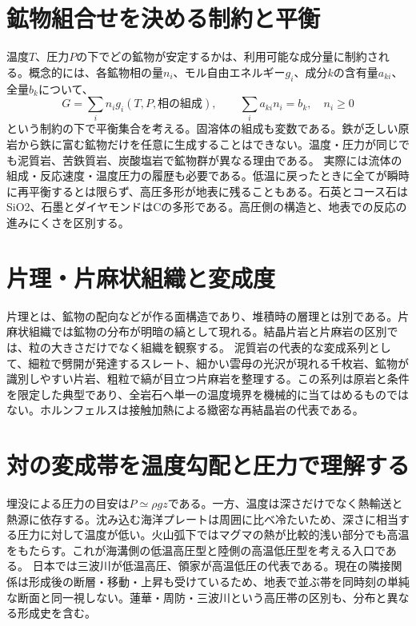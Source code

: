 \section{鉱物組合せを決める制約と平衡}
\label{theory:petrology:equilibrium}
温度\(T\)、圧力\(P\)の下でどの鉱物が安定するかは、利用可能な成分量に制約される。概念的には、各鉱物相の量\(n_i\)、モル自由エネルギー\(g_i\)、成分\(k\)の含有量\(a_{ki}\)、全量\(b_k\)について、
\[
G=\sum_i n_i g_i(T,P,\text{相の組成}),\qquad
\sum_i a_{ki}n_i=b_k,\quad n_i\geq0
\]
という制約の下で平衡集合を考える。固溶体の組成も変数である。鉄が乏しい原岩から鉄に富む鉱物だけを任意に生成することはできない。温度・圧力が同じでも泥質岩、苦鉄質岩、炭酸塩岩で鉱物群が異なる理由である\cite{nelson_assemblages2011}。
実際には流体の組成・反応速度・温度圧力の履歴も必要である。低温に戻ったときに全てが瞬時に再平衡するとは限らず、高圧多形が地表に残ることもある。石英とコース石はSiO2、石墨とダイヤモンドはCの多形である\cite{hokkaido_polymorph2012}。高圧側の構造と、地表での反応の進みにくさを区別する。

\section{片理・片麻状組織と変成度}
\label{theory:petrology:textures}
片理とは、鉱物の配向などが作る面構造であり、堆積時の層理とは別である。片麻状組織では鉱物の分布が明暗の縞として現れる。結晶片岩と片麻岩の区別では、粒の大きさだけでなく組織を観察する\cite{gsj_metamorphic_words}。
泥質岩の代表的な変成系列として、細粒で劈開が発達するスレート、細かい雲母の光沢が現れる千枚岩、鉱物が識別しやすい片岩、粗粒で縞が目立つ片麻岩を整理する\cite{nelson_regional2011}。この系列は原岩と条件を限定した典型であり、全岩石へ単一の温度境界を機械的に当てはめるものではない。ホルンフェルスは接触加熱による緻密な再結晶岩の代表である。

\section{対の変成帯を温度勾配と圧力で理解する}
\label{theory:petrology:paired}
埋没による圧力の目安は\(P\simeq\rho g z\)である。一方、温度は深さだけでなく熱輸送と熱源に依存する。沈み込む海洋プレートは周囲に比べ冷たいため、深さに相当する圧力に対して温度が低い。火山弧下ではマグマの熱が比較的浅い部分でも高温をもたらす。これが海溝側の低温高圧型と陸側の高温低圧型を考える入口である。
日本では三波川が低温高圧、領家が高温低圧の代表である\cite{aist_awa2021}。現在の隣接関係は形成後の断層・移動・上昇も受けているため、地表で並ぶ帯を同時刻の単純な断面と同一視しない。蓮華・周防・三波川という高圧帯の区別も、分布と異なる形成史を含む\cite{tohoku_highpressure,gsj_highpressure2016}。

